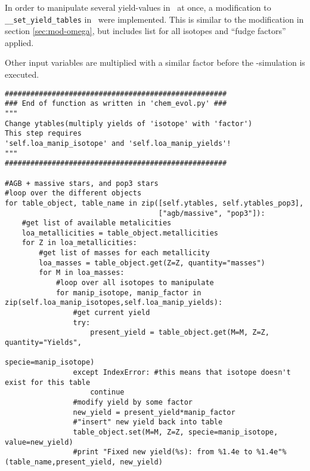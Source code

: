 \label{sec:mod-omega2}

In order to manipulate several yield-values in \omegamodel\ at once, a modification to \verb|__set_yield_tables| in \chemevol\ were implemented.
This is similar to the modification in section \ref{sec:mod-omega}, but includes list for all isotopes and ``fudge factors'' applied.

Other input variables are multiplied with a similar factor before the \omegamodel-simulation is executed.

\begin{lstlisting}[style=custompython, caption={Snippet of code added to the existing function \texttt{\_\_set\_yield\_tables} in \chemevol\ in \omegamodel-framework. The code-snippet multiplies the yield of a list of isotopes, \texttt{self.loa\_manip\_isotope}, with a corresponding factor from a list of factors \texttt{self.loa\_manip\_yields} for all yield-tables where the isotopes can be found.}]
####################################################
### End of function as written in 'chem_evol.py' ###
""" 
Change ytables(multiply yields of 'isotope' with 'factor')
This step requires 
'self.loa_manip_isotope' and 'self.loa_manip_yields'!
"""
####################################################

#AGB + massive stars, and pop3 stars
#loop over the different objects
for table_object, table_name in zip([self.ytables, self.ytables_pop3],
                                    ["agb/massive", "pop3"]):
    #get list of available metalicities
    loa_metallicities = table_object.metallicities
    for Z in loa_metallicities:
        #get list of masses for each metallicity
        loa_masses = table_object.get(Z=Z, quantity="masses")
        for M in loa_masses:
            #loop over all isotopes to manipulate
            for manip_isotope, manip_factor in zip(self.loa_manip_isotopes,self.loa_manip_yields):
                #get current yield 
                try:
                    present_yield = table_object.get(M=M, Z=Z, quantity="Yields",
                                                     specie=manip_isotope)
                except IndexError: #this means that isotope doesn't exist for this table
                    continue
                #modify yield by some factor
                new_yield = present_yield*manip_factor 
                #"insert" new yield back into table
                table_object.set(M=M, Z=Z, specie=manip_isotope, value=new_yield)
                #print "Fixed new yield(%s): from %1.4e to %1.4e"%(table_name,present_yield, new_yield)


\end{lstlisting}
